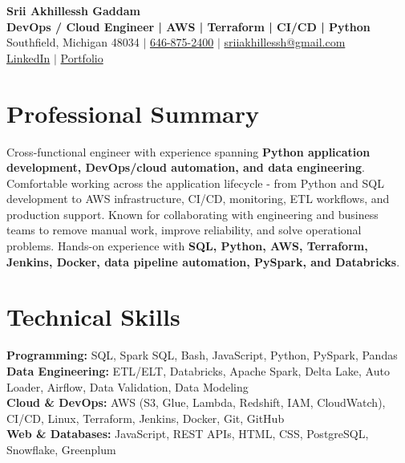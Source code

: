 \documentclass[letterpaper,10pt]{article}
\begin{document}
\fontsize{9.35pt}{10.45pt}\selectfont

\begin{center}
    {\LARGE \textbf{Srii Akhillessh Gaddam}} \\[-1pt]
    \textbf{DevOps / Cloud Engineer | AWS | Terraform | CI/CD | Python} \\[2pt]
    Southfield, Michigan 48034 $|$
    \href{tel:6468752400}{646-875-2400} $|$
    \href{mailto:sriiakhillessh@gmail.com}{sriiakhillessh@gmail.com} \\[1pt]
    \href{https://www.linkedin.com/in/srii-akhiilessh-gaddam-b48668191/}{LinkedIn} $|$
    \href{https://sriiakhillesshg.github.io/portfolio/}{Portfolio}
\end{center}
\vspace{-8pt}

\section{Professional Summary}
\small{Cross-functional engineer with experience spanning \textbf{Python application development, DevOps/cloud automation, and data engineering}. Comfortable working across the application lifecycle - from Python and SQL development to AWS infrastructure, CI/CD, monitoring, ETL workflows, and production support. Known for collaborating with engineering and business teams to remove manual work, improve reliability, and solve operational problems. Hands-on experience with \textbf{SQL, Python, AWS, Terraform, Jenkins, Docker, data pipeline automation, PySpark, and Databricks}.}

\section{Technical Skills}
\small{
\textbf{Programming:} SQL, Spark SQL, Bash, JavaScript, Python, PySpark, Pandas \\
\textbf{Data Engineering:} ETL/ELT, Databricks, Apache Spark, Delta Lake, Auto Loader, Airflow, Data Validation, Data Modeling \\
\textbf{Cloud \& DevOps:} AWS (S3, Glue, Lambda, Redshift, IAM, CloudWatch), CI/CD, Linux, Terraform, Jenkins, Docker, Git, GitHub \\
\textbf{Web \& Databases:} JavaScript, REST APIs, HTML, CSS, PostgreSQL, Snowflake, Greenplum
}
\end{document}
